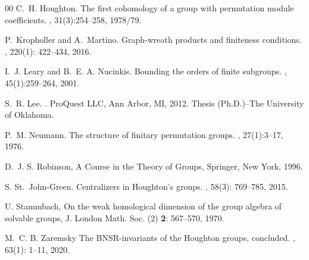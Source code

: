\documentclass[11pt,a4paper]{amsart}
\theoremstyle{definition}
\theoremstyle{remark}
\begin{document}
\begin{thebibliography}{00}
C.~H. Houghton.
\newblock The first cohomology of a group with permutation module coefficients.
, 31(3):254--258, 1978/79.

P.~Kropholler and A.~Martino.
\newblock Graph-wreath products and finiteness conditions.
, 220(1): 422--434, 2016.

I.~J. Leary and B.~E. A. Nucinkis.
\newblock Bounding the orders of finite subgroups.
, 45(1):259--264, 2001.

S.~R. Lee.
.
\newblock ProQuest LLC, Ann Arbor, MI, 2012.
\newblock Thesis (Ph.D.)--The University of Oklahoma.

P.~M. Neumann.
\newblock The structure of finitary permutation groups.
, 27(1):3--17, 1976.

 D.~J. S. Robinson, A Course in the Theory of Groups, Springer, New York, 1996.

S. St.~John-Green. 
\newblock Centralizers in Houghton's groups. 
, 58(3): 769--785, 2015. %


 U. Stammbach, On the weak homological dimension of the group algebra of solvable groups, J. London Math. Soc. (2) {\bf 2}: 567--570, 1970.

M.~C. B. Zaremsky
\newblock The {BNSR}-invariants of the {H}oughton groups, concluded.
, 63(1): 1--11, 2020.

\end{thebibliography}
\end{document}
